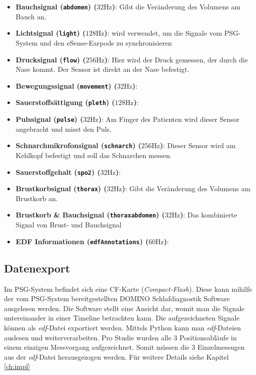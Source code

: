 \begin{itemize}
    \item \textbf{Bauchsignal (\texttt{abdomen}) ($32 \si{\hertz}$)}: Gibt die Veränderung des Volumens am Bauch an.
    \item \textbf{Lichtsignal (\texttt{light}) ($128 \si{\hertz}$)}: wird verwendet, um die Signale vom PSG-System und den eSense-Earpods zu synchronisieren
    \item \textbf{Drucksignal (\texttt{flow}) ($256 \si{\hertz}$)}: Hier wird der Druck gemessen, der durch die Nase kommt. Der Sensor ist direkt an der Nase befestigt.
    \item \textbf{Bewegungssignal (\texttt{movement}) ($32 \si{\hertz}$)}: 
    \item \textbf{Sauerstoffsättigung (\texttt{pleth}) ($128 \si{\hertz}$)}: 
    \item \textbf{Pulssignal (\texttt{pulse}) ($32 \si{\hertz}$)}: Am Finger des Patienten wird dieser Sensor angebracht und misst den Puls.
    \item \textbf{Schnarchmikrofonsignal (\texttt{schnarch}) ($256 \si{\hertz}$)}: Dieser Sensor wird am Kehlkopf befestigt und soll das Schnarchen messen.
    \item \textbf{Sauerstoffgehalt (\texttt{spo2}) ($32 \si{\hertz}$)}: 
    \item \textbf{Brustkorbsignal (\texttt{thorax}) ($32 \si{\hertz}$)}: Gibt die Veränderung des Volumens am Brustkorb an.
    \item \textbf{Brustkorb \& Bauchsignal (\texttt{thoraxabdomen}) ($32 \si{\hertz}$)}: Das kombinierte Signal von Brust- und Bauchsignal
    \item \textbf{EDF Informationen (\texttt{edfAnnotations}) ($60 \si{\hertz}$)}: 
\end{itemize}

\subsection{Datenexport}
\label{ch:sa:psg:export}

Im PSG-System befindet sich eine CF-Karte (\textit{Compact-Flash}). Diese kann mihilfe der vom PSG-System bereitgestellten {\glqq DOMINO Schlafdiagnostik\grqq} Software ausgelesen werden.
Die Software stellt eine Ansicht dar, womit man die Signale untereinander in einer Timeline betrachten kann. Die aufgezeichneten Signale können als \textit{edf}-Datei exportiert werden.
Mittels Python kann man \textit{edf}-Dateien auslesen und weiterverarbeiten.
Pro Studie wurden alle 3 Positionsabläufe in einem einzigen Messvorgang aufgezeichnet. Somit müssen die 3 Einzelmessugen aus der \textit{edf}-Datei herausgezogen werden.
Für weitere Details siehe Kapitel \ref{ch:impl} 

